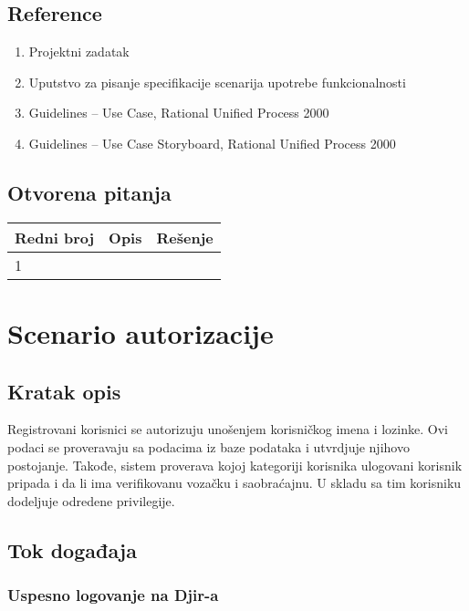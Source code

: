 \documentclass[12pt]{article}
\begin{document}
\subsection{Reference}
\begin{enumerate}
   \item Projektni zadatak
   \item Uputstvo za pisanje specifikacije scenarija upotrebe funkcionalnosti
   \item  Guidelines – Use Case, Rational Unified Process 2000
   \item  Guidelines – Use Case Storyboard, Rational Unified Process 2000
 \end{enumerate}
\subsection{Otvorena pitanja}


\begin{center}
\begin{tabular}{ | m{2cm} | m{7cm}| m{7cm} | } 
\hline
Redni broj& Opis & Rešenje \\ 
\hline
1 &  & \\ 
\hline
\end{tabular}
\end{center}

    

\section{Scenario autorizacije}
\subsection{Kratak opis}
Registrovani korisnici se autorizuju unošenjem korisničkog imena i lozinke. Ovi podaci se proveravaju sa podacima iz baze podataka i utvrdjuje njihovo postojanje. Takođe, sistem proverava kojoj kategoriji korisnika ulogovani korisnik pripada i da li ima verifikovanu vozačku i saobraćajnu. U
skladu sa tim korisniku dodeljuje odredene privilegije.
\subsection{Tok događaja}

\subsubsection{Uspesno logovanje na Djir-a}
\end{document}
